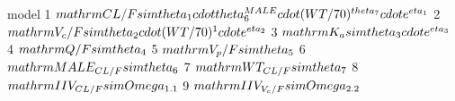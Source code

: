 \begin{Schunk}
\begin{Soutput}
                                                                                                           model
1  $\\mathrm{CL/F  \\sim \\theta_{1}\\cdot  \\theta_{6}^{MALE}\\cdot (WT/70)^{\\theta_{7}}\\cdot e^{\\eta_{1}}}$
2                                   $\\mathrm{V_{c}/F  \\sim \\theta_{2}\\cdot (WT/70)^{1}\\cdot e^{\\eta_{2}}}$
3                                                        $\\mathrm{K_{a} \\sim \\theta_{3}\\cdot e^{\\eta_{3}}}$
4                                                                             $\\mathrm{Q/F  \\sim \\theta_{4}}$
5                                                                         $\\mathrm{V_{p}/F  \\sim \\theta_{5}}$
6                                                                       $\\mathrm{MALE_{CL/F}\\sim \\theta_{6}}$
7                                                                         $\\mathrm{WT_{CL/F}\\sim \\theta_{7}}$
8                                                                      $\\mathrm{IIV_{CL/F}\\sim \\Omega_{1.1}}$
9                                                                   $\\mathrm{IIV_{V_{c}/F}\\sim \\Omega_{2.2}}$

\end{Soutput}
\end{Schunk}
